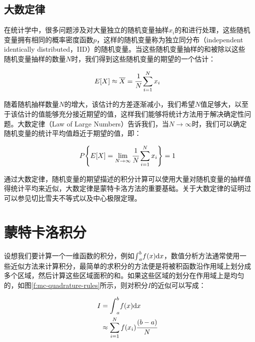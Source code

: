 \subsection{大数定律}
在统计学中，很多问题涉及对大量独立的随机变量抽样$x_i$的和进行处理，这些随机变量拥有相同的概率密度函数$p$，这样的随机变量称为独立同分布（independent identically distributed，IID）的随机变量。当这些随机变量抽样的和被除以这些随机变量抽样的数量$N$时，我们得到这些随机变量的期望的一个估计：

\begin{equation}
	E[X]\approx\overline{X}=  \cfrac{1}{N}\sum_{i=1}^{N}x_i
\end{equation}

\noindent 随着随机抽样数量$N$的增大，该估计的方差逐渐减小，我们希望$N$值足够大，以至于该估计的值能够充分接近期望的值，这样我们能够将统计方法用于解决确定性问题。大数定律（Law of Large Numbers）告诉我们，当$N\rightarrow\infty$时，我们可以确定随机变量的统计平均值趋近于期望的值，即：

\begin{equation}\label{eq:mc-large-numbers}
	P\Bigg\{ E[X]=\lim_{N \to \infty} \cfrac{1}{N}\sum_{i=1}^{N}x_i \Bigg\}=1
\end{equation} 

\noindent 通过大数定律，随机变量的期望描述的积分计算可以使用大量对随机变量的抽样值得统计平均来近似，大数定律是蒙特卡洛方法的重要基础。关于大数定律的证明过可以参见切比雪夫不等式以及中心极限定理。







\section{蒙特卡洛积分}
设想我们要计算一个一维函数的积分，例如${\rm \int}_a^{b}f(x){\rm d}x$，数值分析方法通常使用一些近似方法来计算积分，最简单的求积分的方法便是将被积函数沿作用域上划分成多个区域，然后计算这些区域面积的和。如果这些区域的划分在作用域上是均匀的，如图\ref{f:mc-quadrature-rules}所示，则对积分$I$的近似可以写成：

\begin{equation}\label{eq:mc-quadrature-rules}
	\begin{aligned}
		I&={\rm \int}_{a}^{b}f(x){\rm d}x \\
		&\approx \sum_{i=1}^{N}f(x_i) \cfrac{(b-a)}{N}
	\end{aligned}
\end{equation}


